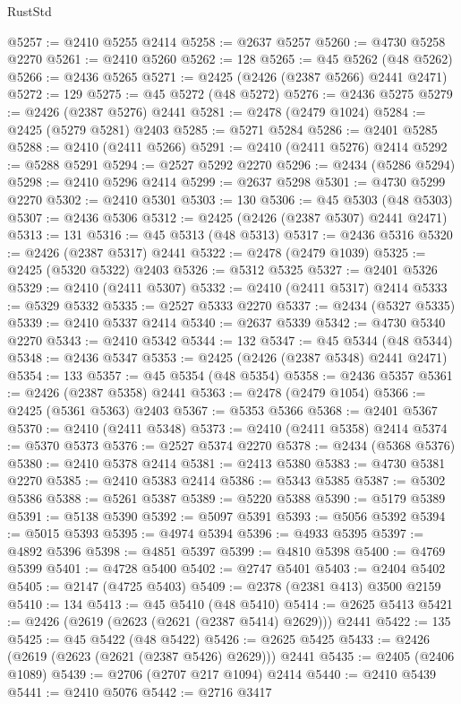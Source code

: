 \begin{lexlean}{RustStd}
\begin{coremodule}
@5257 := @2410 @5255 @2414
@5258 := @2637 @5257
@5260 := @4730 @5258 @2270
@5261 := @2410 @5260
@5262 := 128
@5265 := @45 @5262 (@48 @5262)
@5266 := @2436 @5265
@5271 := @2425 (@2426 (@2387 @5266) @2441 @2471)
@5272 := 129
@5275 := @45 @5272 (@48 @5272)
@5276 := @2436 @5275
@5279 := @2426 (@2387 @5276) @2441
@5281 := @2478 (@2479 @1024)
@5284 := @2425 (@5279 @5281) @2403
@5285 := @5271 @5284
@5286 := @2401 @5285
@5288 := @2410 (@2411 @5266)
@5291 := @2410 (@2411 @5276) @2414
@5292 := @5288 @5291
@5294 := @2527 @5292 @2270
@5296 := @2434 (@5286 @5294)
@5298 := @2410 @5296 @2414
@5299 := @2637 @5298
@5301 := @4730 @5299 @2270
@5302 := @2410 @5301
@5303 := 130
@5306 := @45 @5303 (@48 @5303)
@5307 := @2436 @5306
@5312 := @2425 (@2426 (@2387 @5307) @2441 @2471)
@5313 := 131
@5316 := @45 @5313 (@48 @5313)
@5317 := @2436 @5316
@5320 := @2426 (@2387 @5317) @2441
@5322 := @2478 (@2479 @1039)
@5325 := @2425 (@5320 @5322) @2403
@5326 := @5312 @5325
@5327 := @2401 @5326
@5329 := @2410 (@2411 @5307)
@5332 := @2410 (@2411 @5317) @2414
@5333 := @5329 @5332
@5335 := @2527 @5333 @2270
@5337 := @2434 (@5327 @5335)
@5339 := @2410 @5337 @2414
@5340 := @2637 @5339
@5342 := @4730 @5340 @2270
@5343 := @2410 @5342
@5344 := 132
@5347 := @45 @5344 (@48 @5344)
@5348 := @2436 @5347
@5353 := @2425 (@2426 (@2387 @5348) @2441 @2471)
@5354 := 133
@5357 := @45 @5354 (@48 @5354)
@5358 := @2436 @5357
@5361 := @2426 (@2387 @5358) @2441
@5363 := @2478 (@2479 @1054)
@5366 := @2425 (@5361 @5363) @2403
@5367 := @5353 @5366
@5368 := @2401 @5367
@5370 := @2410 (@2411 @5348)
@5373 := @2410 (@2411 @5358) @2414
@5374 := @5370 @5373
@5376 := @2527 @5374 @2270
@5378 := @2434 (@5368 @5376)
@5380 := @2410 @5378 @2414
@5381 := @2413 @5380
@5383 := @4730 @5381 @2270
@5385 := @2410 @5383 @2414
@5386 := @5343 @5385
@5387 := @5302 @5386
@5388 := @5261 @5387
@5389 := @5220 @5388
@5390 := @5179 @5389
@5391 := @5138 @5390
@5392 := @5097 @5391
@5393 := @5056 @5392
@5394 := @5015 @5393
@5395 := @4974 @5394
@5396 := @4933 @5395
@5397 := @4892 @5396
@5398 := @4851 @5397
@5399 := @4810 @5398
@5400 := @4769 @5399
@5401 := @4728 @5400
@5402 := @2747 @5401
@5403 := @2404 @5402
@5405 := @2147 (@4725 @5403)
@5409 := @2378 (@2381 @413) @3500 @2159
@5410 := 134
@5413 := @45 @5410 (@48 @5410)
@5414 := @2625 @5413
@5421 := @2426 (@2619 (@2623 (@2621 (@2387 @5414) @2629))) @2441
@5422 := 135
@5425 := @45 @5422 (@48 @5422)
@5426 := @2625 @5425
@5433 := @2426 (@2619 (@2623 (@2621 (@2387 @5426) @2629))) @2441
@5435 := @2405 (@2406 @1089)
@5439 := @2706 (@2707 @217 @1094) @2414
@5440 := @2410 @5439
@5441 := @2410 @5076
@5442 := @2716 @3417

\end{coremodule}
\end{lexlean}
